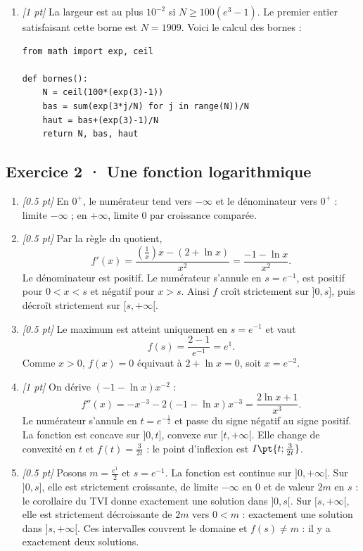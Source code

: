 \begin{enumerate}

\item \textit{[1 pt]} La largeur est au plus $10^{-2}$ si $N\ge100(e^{3}-1)$. Le premier entier satisfaisant cette borne est $N=1909$. Voici le calcul des bornes :
\begin{lstlisting}
from math import exp, ceil

def bornes():
    N = ceil(100*(exp(3)-1))
    bas = sum(exp(3*j/N) for j in range(N))/N
    haut = bas+(exp(3)-1)/N
    return N, bas, haut
\end{lstlisting}


\end{enumerate}

\subsection*{Exercice 2 · Une fonction logarithmique}\begin{enumerate}

\item \textit{[\num{0,5} pt]} En $0^+$, le numérateur tend vers $-\infty$ et le dénominateur vers $0^+$ : limite $-\infty$ ; en $+\infty$, limite $0$ par croissance comparée.

\item \textit{[\num{0,5} pt]} Par la règle du quotient,
\[f'(x)=\frac{(\frac{1}{x})x-(2+\ln x)}{x^2}=\frac{-1-\ln x}{x^2}.\]
Le dénominateur est positif. Le numérateur s'annule en $s=e^{-1}$, est positif pour $0<x<s$ et négatif pour $x>s$. Ainsi $f$ croît strictement sur $]0,s]$, puis décroît strictement sur $[s,+\infty[$.

\item \textit{[\num{0,5} pt]} Le maximum est atteint uniquement en $s=e^{-1}$ et vaut
\[f(s)=\frac{2- 1}{e^{-1}}=e^{1}.\]
Comme $x>0$, $f(x)=0$ équivaut à $2+\ln x=0$, soit $x=e^{-2}$.

\item \textit{[1 pt]} On dérive $(-1-\ln x)x^{-2}$ :
\[f''(x)=-x^{-3}-2(-1-\ln x)x^{-3}=\frac{2\ln x+1}{x^3}.\]
Le numérateur s'annule en $t=e^{-\frac{1}{2}}$ et passe du signe négatif au signe positif. La fonction est concave sur $]0,t]$, convexe sur $[t,+\infty[$. Elle change de convexité en $t$ et $f(t)=\frac{3}{2t}$ : le point d'inflexion est $I\pt{t;\frac{3}{2t}}$.

\item \textit{[\num{0,5} pt]} Posons $m=\frac{e^{1}}{2}$ et $s=e^{-1}$. La fonction est continue sur $]0,+\infty[$. Sur $]0,s]$, elle est strictement croissante, de limite $-\infty$ en $0$ et de valeur $2m$ en $s$ : le corollaire du TVI donne exactement une solution dans $]0,s[$. Sur $[s,+\infty[$, elle est strictement décroissante de $2m$ vers $0<m$ : exactement une solution dans $]s,+\infty[$. Ces intervalles couvrent le domaine et $f(s)\ne m$ : il y a exactement deux solutions.


\end{enumerate}
